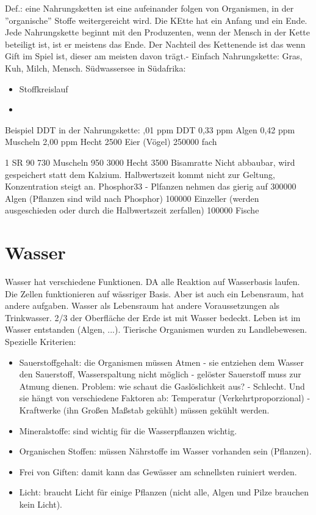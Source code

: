\documentclass[a4paper]{article}
\begin{document}
Def.: eine Nahrungsketten ist eine aufeinander folgen von Organismen, in der ''organische'' Stoffe weitergereicht wird. Die KEtte hat ein Anfang und ein Ende. Jede Nahrungskette beginnt mit den Produzenten, wenn der Mensch in der Kette beteiligt ist, ist er meistens das Ende. Der Nachteil des Kettenende ist das wenn Gift im Spiel ist, dieser am meisten davon trägt.- Einfach Nahrungskette: Gras, Kuh, Milch, Mensch.
\newline
\newline
Südwassersee in Südafrika:
\begin{itemize}
\item Stoffkreislauf
\item 
\end{itemize}

Beispiel DDT in der Nahrungskette:
,01 ppm DDT
0,33 ppm Algen
0,42 ppm Muscheln
2,00 ppm Hecht
2500 Eier (Vögel)
250000 fach
\newline

1 SR 90
730 Muscheln
950 
3000 Hecht
3500 Bisamratte
\newline
Nicht abbaubar, wird gespeichert statt dem Kalzium. Halbwertszeit kommt nicht zur Geltung, Konzentration steigt an.
Phosphor33 - Plfanzen nehmen das gierig auf
300000 Algen (Pflanzen sind wild nach Phosphor)
100000 Einzeller (werden ausgeschieden oder durch die Halbwertszeit zerfallen)
100000 Fische

\section{Wasser}

Wasser hat verschiedene Funktionen. DA alle Reaktion auf Wasserbasis laufen. Die Zellen funktionieren auf wässriger Basis. Aber ist auch ein Lebensraum, hat andere aufgaben. Wasser als Lebensraum hat andere Voraussetzungen als Trinkwasser. 2/3 der Oberfläche der Erde ist mit Wasser bedeckt. Leben ist im Wasser entstanden (Algen, ...). Tierische Organismen wurden zu Landlebewesen.
\newline
\newline
Spezielle Kriterien:

\begin{itemize}
\item Sauerstoffgehalt: die Organismen müssen Atmen - sie entziehen dem Wasser den Sauerstoff, Wasserspaltung nicht möglich - gelöster Sauerstoff muss zur Atmung dienen. Problem: wie schaut die Gaslöslichkeit aus? - Schlecht. Und sie hängt von verschiedene Faktoren ab: Temperatur (Verkehrtproporzional) - Kraftwerke (ihn Großen Maßstab gekühlt) müssen gekühlt werden.
\item Mineralstoffe: sind wichtig für die Wasserpflanzen wichtig.
\item Organischen Stoffen: müssen Nährstoffe im Wasser vorhanden sein (Pflanzen).
\item Frei von Giften: damit kann das Gewässer am schnellsten ruiniert werden.
\item Licht: braucht Licht für einige Pflanzen (nicht alle, Algen und Pilze brauchen kein Licht).
\end{itemize}
\end{document}
